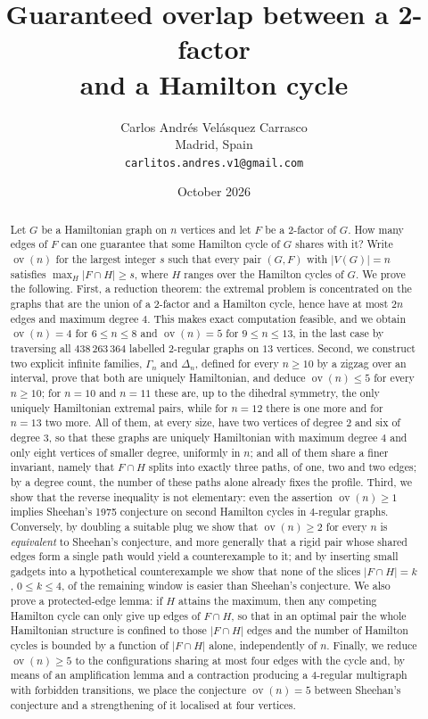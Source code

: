 \documentclass[11pt,a4paper]{article}
\title{Guaranteed overlap between a 2-factor\\ and a Hamilton cycle}
\author{Carlos Andrés Velásquez Carrasco\\ \small Madrid, Spain\\ \small\texttt{carlitos.andres.v1@gmail.com}}
\date{October 2026}
\theoremstyle{definition}
\theoremstyle{remark}
\newcommand{\ov}{\operatorname{ov}}
\begin{document}
\maketitle

\begin{abstract}
Let $G$ be a Hamiltonian graph on $n$ vertices and let $F$ be a 2-factor of $G$. How many edges of $F$ can one guarantee that some Hamilton cycle of $G$ shares with it? Write $\ov(n)$ for the largest integer $s$ such that every pair $(G,F)$ with $|V(G)|=n$ satisfies $\max_H|F\cap H|\ge s$, where $H$ ranges over the Hamilton cycles of $G$. We prove the following. First, a reduction theorem: the extremal problem is concentrated on the graphs that are the union of a 2-factor and a Hamilton cycle, hence have at most $2n$ edges and maximum degree $4$. This makes exact computation feasible, and we obtain $\ov(n)=4$ for $6\le n\le8$ and $\ov(n)=5$ for $9\le n\le13$, in the last case by traversing all $438\,263\,364$ labelled $2$-regular graphs on $13$ vertices. Second, we construct two explicit infinite families, $\Gamma_n$ and $\Delta_n$, defined for every $n\ge10$ by a zigzag over an interval, prove that both are uniquely Hamiltonian, and deduce $\ov(n)\le5$ for every $n\ge10$; for $n=10$ and $n=11$ these are, up to the dihedral symmetry, the only uniquely Hamiltonian extremal pairs, while for $n=12$ there is one more and for $n=13$ two more. All of them, at every size, have two vertices of degree $2$ and six of degree $3$, so that these graphs are uniquely Hamiltonian with maximum degree $4$ and only eight vertices of smaller degree, uniformly in $n$; and all of them share a finer invariant, namely that $F\cap H$ splits into exactly three paths, of one, two and two edges; by a degree count, the number of these paths alone already fixes the profile. Third, we show that the reverse inequality is not elementary: even the assertion $\ov(n)\ge1$ implies Sheehan's 1975 conjecture on second Hamilton cycles in $4$-regular graphs. Conversely, by doubling a suitable plug we show that $\ov(n)\ge2$ for every $n$ is \emph{equivalent} to Sheehan's conjecture, and more generally that a rigid pair whose shared edges form a single path would yield a counterexample to it; and by inserting small gadgets into a hypothetical counterexample we show that none of the slices $|F\cap H|=k$, $0\le k\le4$, of the remaining window is easier than Sheehan's conjecture. We also prove a protected-edge lemma: if $H$ attains the maximum, then any competing Hamilton cycle can only give up edges of $F\cap H$, so that in an optimal pair the whole Hamiltonian structure is confined to those $|F\cap H|$ edges and the number of Hamilton cycles is bounded by a function of $|F\cap H|$ alone, independently of $n$. Finally, we reduce $\ov(n)\ge5$ to the configurations sharing at most four edges with the cycle and, by means of an amplification lemma and a contraction producing a $4$-regular multigraph with forbidden transitions, we place the conjecture $\ov(n)=5$ between Sheehan's conjecture and a strengthening of it localised at four vertices.
\end{abstract}
\end{document}

